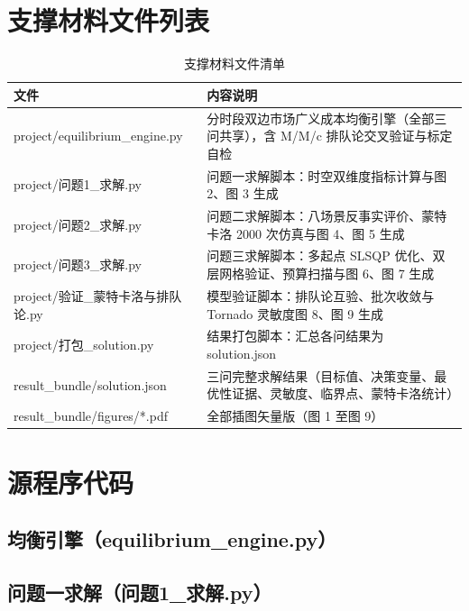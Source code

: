 \documentclass[12pt,a4paper]{ctexart}
\begin{document}
\appendix
{}

\section{支撑材料文件列表}

\begin{table}[H]
\centering
\caption{支撑材料文件清单}
\begin{tabular}{p{5.2cm}p{8.4cm}}
\toprule
文件 & 内容说明 \\
\midrule
project/equilibrium\_engine.py & 分时段双边市场广义成本均衡引擎（全部三问共享），含 M/M/c 排队论交叉验证与标定自检 \\
project/问题1\_求解.py & 问题一求解脚本：时空双维度指标计算与图 2、图 3 生成 \\
project/问题2\_求解.py & 问题二求解脚本：八场景反事实评价、蒙特卡洛 2000 次仿真与图 4、图 5 生成 \\
project/问题3\_求解.py & 问题三求解脚本：多起点 SLSQP 优化、双层网格验证、预算扫描与图 6、图 7 生成 \\
project/验证\_蒙特卡洛与排队论.py & 模型验证脚本：排队论互验、批次收敛与 Tornado 灵敏度图 8、图 9 生成 \\
project/打包\_solution.py & 结果打包脚本：汇总各问结果为 solution.json \\
result\_bundle/solution.json & 三问完整求解结果（目标值、决策变量、最优性证据、灵敏度、临界点、蒙特卡洛统计） \\
result\_bundle/figures/*.pdf & 全部插图矢量版（图 1 至图 9） \\
\bottomrule
\end{tabular}
\end{table}

\section{源程序代码}

\subsection{均衡引擎（equilibrium\_engine.py）}

\subsection{问题一求解（问题1\_求解.py）}
\end{document}
